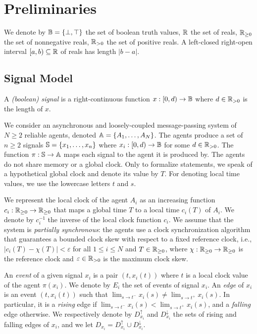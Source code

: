 \section{Preliminaries}

We denote by $\B = \{ \bot, \top \}$ the set of boolean truth values, $\R$ the set of reals, $\R_{\geq 0}$ the set of nonnegative reals, $\R_{> 0}$ the set of positive reals.
A left-closed right-open interval $[a,b) \subseteq \R$ of reals has length $|b-a|$.

\subsection{Signal Model}

\begin{definition}
	A \emph{(boolean) signal} is a right-continuous function $x : [0,d) \to \B$ where $d \in \R_{> 0}$ is the length of $x$.
\end{definition}

We consider an asynchronous and loosely-coupled message-passing system of $N \geq 2$ reliable agents, denoted $\A = \{A_1, \ldots, A_N\}$.
The agents produce a set of $n \geq 2$ signals $\S = \{x_1, \ldots, x_n\}$ where $x_i : [0,d) \to \B$ for some $d \in \R_{> 0}$.
The function $\pi : \S \to \A$ maps each signal to the agent it is produced by.
The agents do not share memory or a global clock.
Only to formalize statements, we speak of a hypothetical global clock and denote its value by $T$.
For denoting local time values, we use the lowercase letters $t$ and $s$.

We represent the local clock of the agent $A_i$ as an increasing function $c_i : \R_{\geq 0} \to \R_{\geq 0}$ that maps a global time $T$ to a local time $c_i(T)$ of $A_i$.
We denote by $c_i^{-1}$ the inverse of the local clock function $c_i$.
We assume that the system is \emph{partially synchronous}: the agents use a clock synchronization algorithm that guarantees a bounded clock skew with respect to a fixed reference clock, i.e., $|c_i(T) - \chi(T)| < \varepsilon$ for all $1 \leq i \leq N$ and $T \in \R_{\geq 0}$, where $\chi : \R_{\geq 0} \to \R_{\geq 0}$ is the reference clock and $\varepsilon \in \R_{> 0}$ is the maximum clock skew. %

An \emph{event} of a given signal $x_i$ is a pair $(t, x_i(t))$ where $t$ is a local clock value of the agent $\pi(x_i)$.
We denote by $E_i$ the set of events of signal $x_i$.
An \emph{edge} of $x_i$ is an event $(t, x_i(t))$ such that $\lim_{s \to t^-} x_i(s) \neq \lim_{s \to t^+} x_i(s)$.
In particular, it is a \emph{rising} edge if $\lim_{s \to t^-} x_i(s) < \lim_{s \to t^+} x_i(s)$, and a \emph{falling} edge otherwise.
We respectively denote by $D_{x_i}^\uparrow$ and $D_{x_i}^\downarrow$ the sets of rising and falling edges of $x_i$, and we let $D_{x_i} = D_{x_i}^\uparrow \cup D_{x_i}^\downarrow$.

